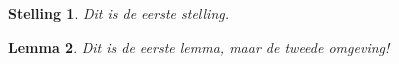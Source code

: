 \documentclass[varwidth=100mm,border=2pt]{standalone}
\newtheorem{stelling}{Stelling}
\newtheorem{lemma}[stelling]{Lemma}
\begin{document}
\centering
\begin{stelling}
    Dit is de eerste stelling. 
\end{stelling}
\begin{lemma}
    Dit is de eerste lemma, maar de tweede omgeving!
\end{lemma}
\end{document}
